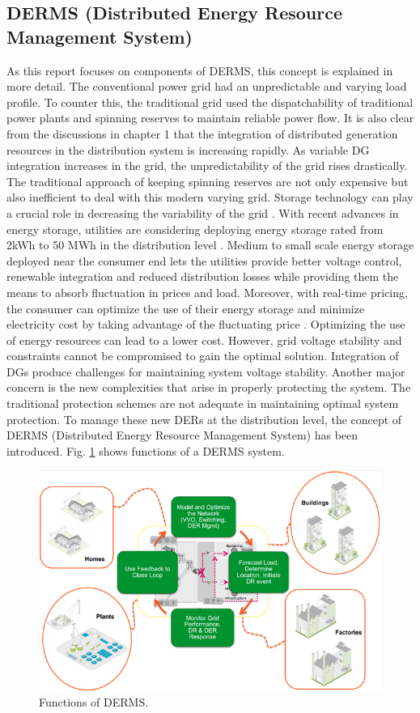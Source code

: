 \subsection{DERMS (Distributed Energy Resource Management System)}
As this report focuses on components of DERMS, this concept is explained in more detail. The conventional power grid had an unpredictable and varying load profile. To counter this, the traditional grid used the dispatchability of traditional power plants and spinning reserves to maintain reliable power flow. It is also clear from the discussions in chapter 1 that the integration of distributed generation resources in the distribution system is increasing rapidly. As variable DG integration increases in the grid, the unpredictability of the grid rises drastically. The traditional approach of keeping spinning reserves are not only expensive but also inefficient to deal with this modern varying grid. Storage technology can play a crucial role in decreasing the variability of the grid \cite{USD13}. With recent advances in energy storage, utilities are considering deploying energy storage rated from 2kWh to 50 MWh in the distribution level \cite{Cle12}. Medium to small scale energy storage deployed near the consumer end lets the utilities provide better voltage control, renewable integration and reduced distribution losses while providing them the means to absorb fluctuation in prices and load. Moreover, with real-time pricing, the consumer can optimize the use of their energy storage and minimize electricity cost by taking advantage of the fluctuating price \cite{BPR11,PMv13,ASB17}.
Optimizing the use of energy resources can lead to a lower cost. However, grid voltage stability and constraints cannot be compromised to gain the optimal solution. Integration of DGs produce challenges for maintaining system voltage stability. Another major concern is the new complexities that arise in properly protecting the system. The traditional protection schemes are not adequate in maintaining optimal system protection. To manage these new DERs at the distribution level, the concept of DERMS (Distributed Energy Resource Management System) has been introduced. Fig. \ref{fig:DERMS_ARCH} shows functions of a DERMS system. 

\begin{figure}[!h]
\centering
\includegraphics[width=0.85\linewidth]{figs/DERMS_ARCH.png}
\caption[Functions of DERMS.]{Functions of DERMS. \cite{DERMS_1}}
\label{fig:DERMS_ARCH}
\end{figure}

